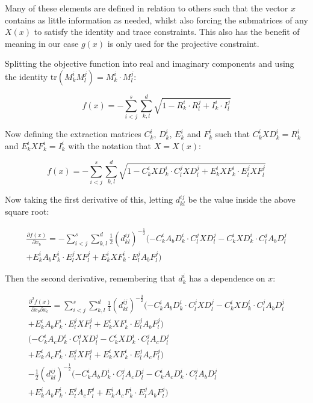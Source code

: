 \documentclass{article}
\begin{document}
Many of these elements are defined in relation to others such that the vector $x$ contains as little information as needed, whilst also forcing the submatrices of any $X(x)$ to satisfy the identity and trace constraints. This also has the benefit of meaning in our case $g(x)$ is only used for the projective constraint.

Splitting the objective function into real and imaginary components and using the identity $\text{tr}(M_k^i M_l^j) = M_k^i \cdot M_l^j$:

\begin{equation}
	f(x) = -\sum_{i<j}^s \sum_{k,l}^d \sqrt{1 - R_k^i \cdot R_l^j + I_k^i \cdot I_l^j}
\end{equation}

Now defining the extraction matrices $C_k^i$, $D_k^i$, $E_k^i$ and $F_k^i$ such that $C_k^i X D_k^i = R_k^i$ and $E_k^i X F_k^i = I_k^i$ with the notation that $X = X(x)$:

\begin{equation}
	f(x) = -\sum_{i<j}^s \sum_{k,l}^d \sqrt{1 - C_k^i X D_k^i \cdot C_l^j X D_l^j + E_k^i X F_k^i \cdot E_l^j X F_l^j} 
\end{equation}

Now taking the first derivative of this, letting $d_{kl}^{ij}$ be the value inside the above square root:

\begin{align}
	\frac{\partial f(x)}{\partial x_b} = -\sum_{i<j}^s \sum_{k,l}^d \frac{1}{2}(d_{kl}^{ij})^{-\frac{1}{2}}(-C_k^i A_b D_k^i \cdot C_l^j X D_l^j - C_k^i X D_k^i \cdot C_l^j A_b D_l^j \\
	+ E_k^i A_b F_k^i \cdot E_l^j X F_l^j + E_k^i X F_k^i \cdot E_l^j A_b F_l^j) 
\end{align}

Then the second derivative, remembering that $d_k^i$ has a dependence on $x$:

\begin{align}
	\frac{\partial^2 f(x)}{\partial x_b \partial x_c} = \sum_{i<j}^s \sum_{k,l}^d \frac{1}{4}(d_{kl}^{ij})^{-\frac{3}{2}}(-C_k^i A_b D_k^i \cdot C_l^j X D_l^j - C_k^i X D_k^i \cdot C_l^j A_b D_l^j \\
	+ E_k^i A_b F_k^i \cdot E_l^j X F_l^j + E_k^i X F_k^i \cdot E_l^j A_b F_l^j) \\
	(-C_k^i A_c D_k^i \cdot C_l^j X D_l^j - C_k^i X D_k^i \cdot C_l^j A_c D_l^j \\
	+ E_k^i A_c F_k^i \cdot E_l^j X F_l^j + E_k^i X F_k^i \cdot E_l^j A_c F_l^j) \\
	-\frac{1}{2}(d_{kl}^{ij})^{-\frac{1}{2}}(-C_k^i A_b D_k^i \cdot C_l^j A_c D_l^j - C_k^i A_c D_k^i \cdot C_l^j A_b D_l^j \\
	+ E_k^i A_b F_k^i \cdot E_l^j A_c F_l^j + E_k^i A_c F_k^i \cdot E_l^j A_b F_l^j)
\end{align}
\end{document}
